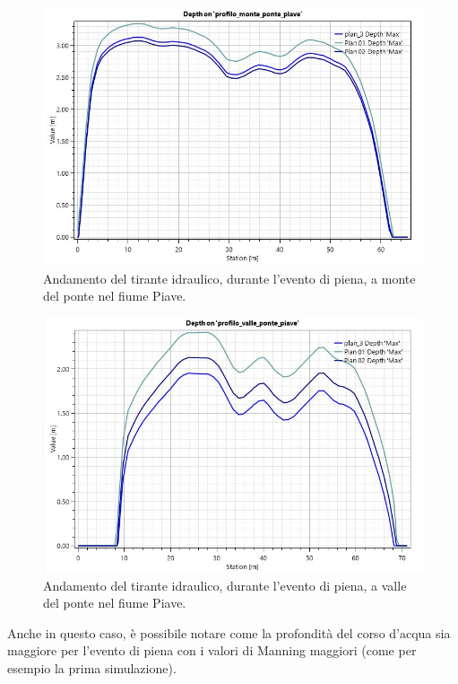 \begin{figure}[H] \centering
    \includegraphics[scale=0.5]{immagini/depth_monte_ponte_piave.JPG}
    \caption{Andamento del tirante idraulico, durante l'evento di piena, a monte del ponte nel fiume Piave.}
    \label{figure:depth_monte_ponte_piave}
\end{figure}

\begin{figure}[H] \centering
    \includegraphics[scale=0.5]{immagini/depth_valle_ponte_piave.JPG}
    \caption{Andamento del tirante idraulico, durante l'evento di piena, a valle del ponte nel fiume Piave.}
    \label{figure:depth_valle_ponte_piave}
\end{figure}

Anche in questo caso, è possibile notare come la profondità del corso d'acqua sia maggiore per l'evento di piena con i valori di Manning maggiori (come per esempio la prima simulazione).


